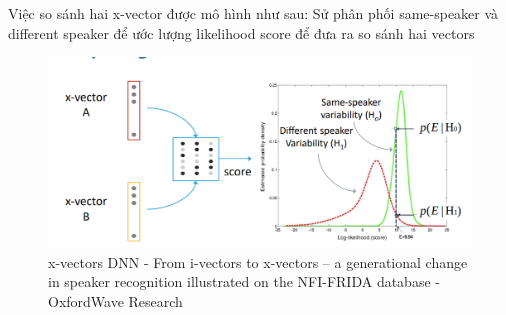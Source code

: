 \documentclass{article}
\begin{document}
	Việc so sánh hai x-vector được mô hình như sau: Sử phân phối same-speaker và different speaker để ước lượng likelihood score để đưa ra so sánh hai vectors
	\begin{figure}[H]
		\centering
		\includegraphics[width=0.75\linewidth]{images/comparing_x_vectors.png}
		\caption{x-vectors DNN - From i-vectors to x-vectors – a generational change in speaker recognition illustrated on the NFI-FRIDA database - OxfordWave Research}
		\label{fig:writing-thesis}
	\end{figure}
\end{document}
